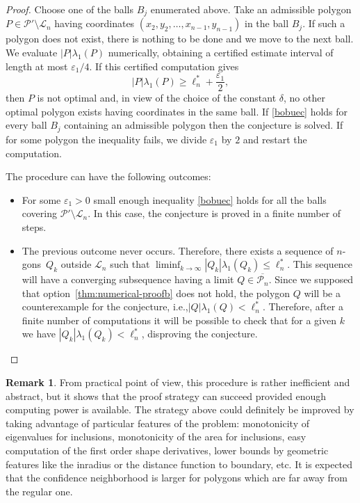 \documentclass[11pt]{article}
\newcommand{\ie}{i.e.,\xspace}
\numberwithin{equation}{section}\newtheorem*{jepEnonce}{\jepEnonceTitle}\newenvironment{enonce*}[1]{\def\jepEnonceTitle{#1}\jepEnonce}{\endjepEnonce}\newtheorem*{conj*}{Conjecture}
\theoremstyle{plain}
\theoremstyle{definition}
\newtheorem{rem}[thm]{Remark}
\newcommand{\vps}{\varepsilon}
\newcommand{\lb}{\lambda}
\newcommand{\sm}{\setminus}
\begin{document}
\begin{proof}
Choose one of the balls $B_j$ enumerated above. Take an admissible polygon $P\in \mathcal P'\sm \mathcal L_n$ having coordinates $(x_2,y_2,\dots,x_{n-1},y_{n-1})$ in the ball $B_j$. If such a polygon does not exist, there is nothing to be done and we move to the next ball. We evaluate $|P|\lb_1(P)$ numerically, obtaining a certified estimate interval of length at most $\varepsilon_1/4$. If this certified computation gives
\begin{equation}\label{bobuec}
|P|\lb_1(P)\ge \ell_n^*+ \frac{\vps_1}{2},
\end{equation}
then $P$ is not optimal and, in view of the choice of the constant $\delta$, no other optimal polygon exists having coordinates in the same ball. If \eqref{bobuec} holds for every ball $B_j$ containing an admissible polygon then the conjecture is solved.
If for some polygon the inequality fails, we divide $\vps_1$ by $2$ and restart the computation.

The procedure can have the following outcomes:

\begin{itemize}
\item For some $\varepsilon_1>0$ small enough inequality \eqref{bobuec} holds for all the balls covering $\mathcal P'\setminus \mathcal L_n$. In this case, the conjecture is proved in a finite number of steps.
\item The previous outcome never occurs. Therefore, there exists a sequence of $n$\nobreakdash-gons~$Q_k$ outside $\mathcal L_n$ such that $\liminf_{k \to \infty}|Q_k|\lambda_1(Q_k) \leq \ell_n^*$. This sequence will have a converging subsequence having a limit $Q \in \overline{\mathcal P_n}$. Since we supposed that option~\eqref{thm:numerical-proofb} does not hold, the polygon $Q$ will be a counterexample for the conjecture, \ie $|Q|\lambda_1(Q)<\ell_n^*$. Therefore, after a finite number of computations it will be possible to check that for a given $k$ we have $|Q_k|\lambda_1(Q_k)<\ell_n^*$, disproving the conjecture.\qedhere
\end{itemize}
\end{proof}

\begin{rem}
From practical point of view, this procedure is rather inefficient and abstract, but it shows that the proof strategy can succeed provided enough computing power is available.
The strategy above could definitely be improved by taking advantage of particular features of the problem: monotonicity of eigenvalues for inclusions, monotonicity of the area for inclusions, easy computation of the first order shape derivatives, lower bounds by geometric features like the inradius or the distance function to boundary, etc. It is expected that the confidence neighborhood is larger for polygons which are far away from the regular one.
\end{rem}
\end{document}
